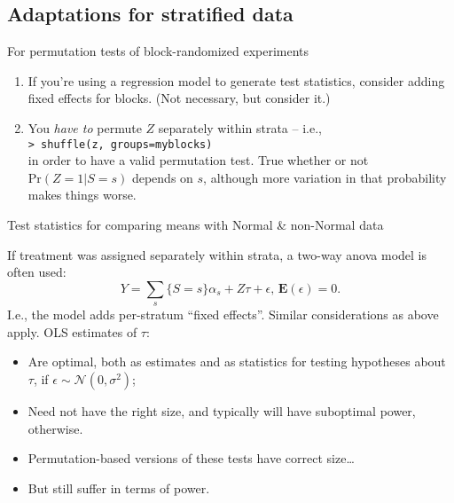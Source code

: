 \subsection{Adaptations for stratified data}

\begin{frame}{For permutation tests of block-randomized experiments}
  
  \begin{enumerate}
  \item If you're using a regression model to generate test statistics, consider adding fixed effects for blocks. (Not necessary, but consider it.)
  \item  You \textit{have to} permute $Z$ separately within strata -- i.e.,\\ 
\texttt{> shuffle(z, groups=myblocks)}\\
in order to have a  valid permutation test. True whether or not $\mathrm{Pr}(Z=1|S=s)$ depends on $s$, although more variation in that probability makes things worse.
  \end{enumerate}




\end{frame}

\begin{frame}{Test statistics for comparing means with Normal \& non-Normal data}

If treatment was assigned separately within strata, a two-way anova model is often used:
$$
Y = \sum_{s}\{S=s\}\alpha_{s} + Z\tau + \epsilon,\, \mathbf{E}(\epsilon) = 0.
$$  
I.e., the model adds per-stratum ``fixed effects''.  Similar considerations as above apply. OLS estimates of $\tau$:
\begin{itemize}[<+->]
  \item Are optimal, both as estimates and as statistics for testing hypotheses about $\tau$, if $\epsilon \sim \mathcal{N}(0, \sigma^{2})$;
  \item Need not have the right size, and typically will have suboptimal power, otherwise.
  \item Permutation-based versions of these tests have correct size\ldots
  \item But still suffer in terms of power.
\end{itemize}

\end{frame}

